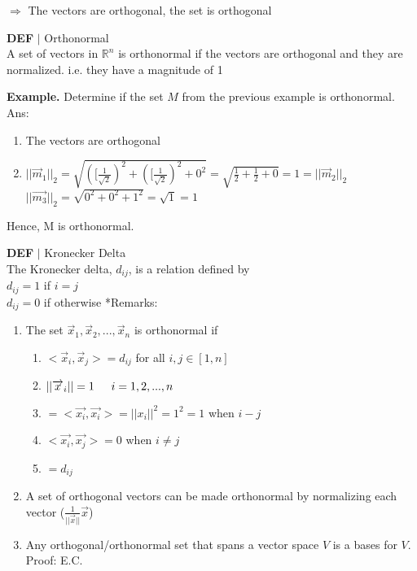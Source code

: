 \documentclass [12pt]{article}
\begin{document}
$\Rightarrow$ The vectors are orthogonal, the set is orthogonal
\begin{framed}
\noindent\textbf{DEF} $|$ Orthonormal\\
A set of vectors in $\mathbb{R}^n$ is orthonormal if the vectors are orthogonal and they are normalized. i.e. they have a magnitude of 1
\end{framed}
\noindent\textbf{Example.} Determine if the set $M$ from the previous example is orthonormal.\\
Ans:
\begin{enumerate}
    \item The vectors are orthogonal
    \item $||\overrightarrow{m}_1||_2 = \sqrt{([\frac{1}{\sqrt{2}})^2+([\frac{1}{\sqrt{2}})^2+0^2}=\sqrt{\frac{1}{2}+\frac{1}{2}+0}= 1 = ||\overrightarrow{m}_2||_2$\\
    $||\overrightarrow{m_3}||_2=\sqrt{0^2+0^2+1^2}=\sqrt{1}=1$\\
\end{enumerate}
Hence, M is orthonormal.
\begin{framed}
\noindent\textbf{DEF} $|$ Kronecker Delta\\
The Kronecker delta, $d_{ij}$, is a relation defined by\\
$d_{ij} = 1$ if $i=j$\\
$d_{ij} = 0$ if otherwise
*Remarks:
\begin{enumerate}
    \item The set ${\overrightarrow{x}_1,\overrightarrow{x}_2,...,\overrightarrow{x}_n}$ is orthonormal if \begin{enumerate}
        \item $<\overrightarrow{x}_i,\overrightarrow{x}_j>= d_{ij}$ for all $i,j\in[1,n]$
        \item $||\overrightarrow{x}_i||=1\indent i=1,2,...,n$
        \item $=<\overrightarrow{x_i},\overrightarrow{x_i}>=||x_i||^2=1^2=1$ when $i-j$
        \item $<\overrightarrow{x_i},\overrightarrow{x_j}>=0$ when $i\neq j$ 
        \item $=d_{ij}$
    \end{enumerate}
    \item A set of orthogonal vectors can be made orthonormal by normalizing each vector ($\frac{1}{||\overrightarrow{x}||}\overrightarrow{x}$)
    \item Any orthogonal/orthonormal set that spans a vector space $V$ is a bases for $V$. Proof: E.C.
\end{enumerate}
\end{framed}
\end{document}
